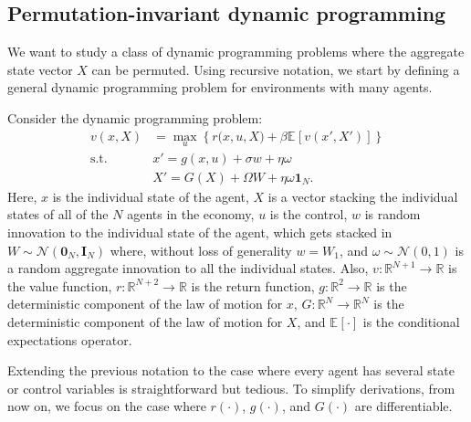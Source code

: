\documentclass[12pt]{article}
\newcommand{\expec}[2][]{\ensuremath{\mathbb{E}_{{#1}}\left[ {#2} \right]}}
\begin{document}
\subsection{Permutation-invariant dynamic programming}

We want to study a class of dynamic programming problems where the aggregate state vector $X$ can be permuted. Using recursive notation, we start by defining a general dynamic programming problem for environments with many agents.

\begin{definition} \label{def:dyn-prog}
Consider the dynamic programming problem:
\begin{align}
v(x,X) &=\max_{u}\left\{r\big(x,u,X\big) + \beta \expec{v(x',X')}\right\}\label{eq:bellman1}\\
\text{s.t. } & x' = g(x,u) + \sigma w + \eta \omega\label{eq:x-lom1}\\
& X' = G(X) + \Omega W + \eta \omega \mathbf{1}_N \label{eq:X-lom1}. 
\end{align}
Here, $x$ is the individual state of the agent, $X$ is a vector stacking the individual states of all of the $N$ agents in the economy, $u$ is the control, $w$ is random innovation to the individual state of the agent, which gets stacked in $W \sim \mathcal{N}(\mathbf{0}_N,\mathbf{I}_N)$ where, without loss of generality $w = W_1$, and $\omega \sim \mathcal{N}(0,1)$ is a random aggregate innovation to all the individual states. Also, $v: \mathbb{R}^{N+1}\rightarrow \mathbb{R}$ is the value function, $r: \mathbb{R}^{N+2}\rightarrow \mathbb{R}$ is the return function, $g:\mathbb{R}^2\rightarrow \mathbb{R}$ is the deterministic component of the law of motion for $x$, $G:\mathbb{R}^N\rightarrow \mathbb{R}^N$ is the deterministic component of the law of motion for $X$, and $\expec{\cdot}$ is the conditional expectations operator.
\end{definition} 

Extending the previous notation to the case where every agent has several state or control variables is straightforward but tedious. To simplify derivations, from now on, we focus on the case where $r(\cdot)$, $g(\cdot)$, and $G(\cdot)$ are differentiable.
 	
\end{document}
